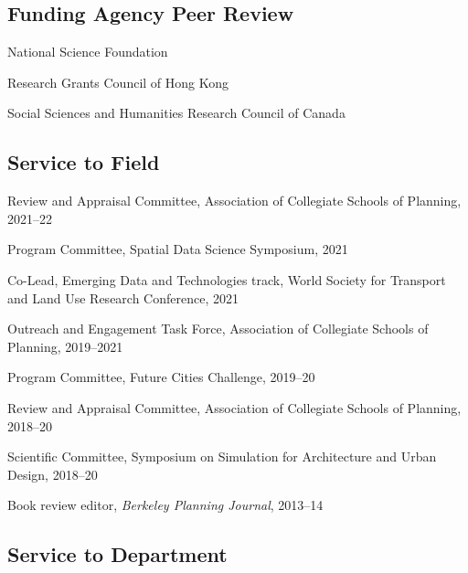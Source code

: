 \documentclass[12pt,letterpaper]{report}
\newcommand{\listitemspace}{0.25em}
\renewenvironment{itemize}
{\begin{list}{}{\setlength{\leftmargin}{0em}
                \setlength{\parskip}{0em}
                \setlength{\itemsep}{\listitemspace}
                \setlength{\parsep}{\listitemspace}}}
{\end{list}}
\begin{document}
    \subsection*{Funding Agency Peer Review}

    \begin{itemize}

        \item National Science Foundation
        \item Research Grants Council of Hong Kong
        \item Social Sciences and Humanities Research Council of Canada

    \end{itemize}

    \subsection*{Service to Field}

    \begin{itemize}

        \item Review and Appraisal Committee, Association of Collegiate Schools of Planning, 2021--22
        \item Program Committee, Spatial Data Science Symposium, 2021
        \item Co-Lead, Emerging Data and Technologies track, World Society for Transport and Land Use Research Conference, 2021
        \item Outreach and Engagement Task Force, Association of Collegiate Schools of Planning, 2019--2021
        \item Program Committee, Future Cities Challenge, 2019--20
        \item Review and Appraisal Committee, Association of Collegiate Schools of Planning, 2018--20
        \item Scientific Committee, Symposium on Simulation for Architecture and Urban Design, 2018--20
        \item Book review editor, \textit{Berkeley Planning Journal}, 2013--14

    \end{itemize}

    \subsection*{Service to Department}
\end{document}
